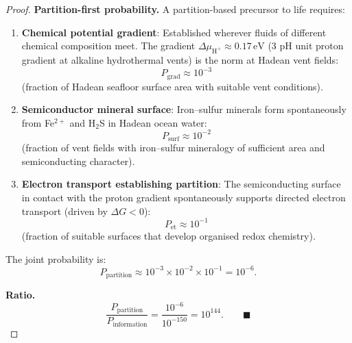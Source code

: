 \begin{proof}
\medskip
\noindent\textbf{Partition-first probability.}
A partition-based precursor to life requires:

\begin{enumerate}[label=(\alph*)]
  \item \textbf{Chemical potential gradient}: Established wherever fluids of
        different chemical composition meet. The gradient $\Delta\mu_{\mathrm{H}^+}
        \approx 0.17\,\mathrm{eV}$ (3 pH unit proton gradient at alkaline
        hydrothermal vents) is the norm at Hadean vent fields:
        \begin{equation}
          P_{\mathrm{grad}} \approx 10^{-3}
          \label{eq:p_grad}
        \end{equation}
        (fraction of Hadean seafloor surface area with suitable vent conditions).
  \item \textbf{Semiconductor mineral surface}: Iron--sulfur minerals form
        spontaneously from Fe$^{2+}$ and H$_2$S in Hadean ocean water:
        \begin{equation}
          P_{\mathrm{surf}} \approx 10^{-2}
          \label{eq:p_surf}
        \end{equation}
        (fraction of vent fields with iron--sulfur mineralogy of sufficient area
        and semiconducting character).
  \item \textbf{Electron transport establishing partition}: The semiconducting
        surface in contact with the proton gradient spontaneously supports
        directed electron transport (driven by $\Delta G < 0$):
        \begin{equation}
          P_{\mathrm{et}} \approx 10^{-1}
          \label{eq:p_et}
        \end{equation}
        (fraction of suitable surfaces that develop organised redox chemistry).
\end{enumerate}

The joint probability is:
\begin{equation}
  P_{\mathrm{partition}} \approx 10^{-3} \times 10^{-2} \times 10^{-1} = 10^{-6}.
  \label{eq:p_partition}
\end{equation}

\medskip
\noindent\textbf{Ratio.}
\begin{equation}
  \frac{P_{\mathrm{partition}}}{P_{\mathrm{information}}}
  = \frac{10^{-6}}{10^{-150}} = 10^{144}. \qquad\blacksquare
  \label{eq:ratio_final}
\end{equation}
\end{proof}

